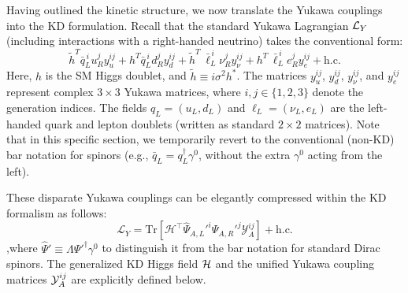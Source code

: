 Having outlined the kinetic structure, we now translate the Yukawa couplings into the KD formulation. 
Recall that the standard Yukawa Lagrangian ${\cal L}_{Y}$ (including interactions with a right-handed neutrino) takes the conventional form:
\begin{equation}\label{eq:Yukawa_standard}
     \tilde{h}^{T}\!\bar{q}_L^{\,i}u_R^j y_u^{ij} + 
     h^{T}\!\bar{q}_L^{\,i}d_R^j y_d^{ij} + \tilde{h}^{T\;\!}\!\bar{\ell}_L^{\,i}\nu_R^j y_\nu^{ij} + h^{T\;\!}\!\bar{\ell}_L^{\,i} e_R^j y_e^{ij} + \text{h.c.}
\end{equation}
Here, $h$ is the SM Higgs doublet, and $\tilde{h}\equiv i\sigma^{2}h^{\ast}$. The matrices $y_{u}^{ij}$, $y_{d}^{ij}$, $y_{\nu}^{ij}$, and $y_{e}^{ij}$ represent complex $3\times 3$ Yukawa matrices, where $i,j\in \{1,2,3\}$ denote the generation indices. The fields $q_{L}=(u_{L},d_{L})$ and $\ell_{L}=(\nu_{L},e_{L})$ are the left-handed quark and lepton doublets (written as standard $2\times2$ matrices). Note that in this specific section, we temporarily revert to the conventional (non-KD) bar notation for spinors (e.g., $\bar{q}_{L}=q_{L}^{\dagger}\gamma^{0}$, without the extra $\gamma^{0}$ acting from the left).

These disparate Yukawa couplings can be elegantly compressed within the KD formalism as follows:
\begin{equation}\label{eq:Yukawa_KD}
    \mathcal{L}_{Y}=
    \text{Tr}[\mathcal{H}^{\top}\widehat{\Psi}_{A,L}'^{i}\Psi_{A,R}'^j \mathcal{Y}_A^{ij}] + \text{h.c.}  
\end{equation}
,where $\widehat{\Psi}' \equiv \Lambda \Psi'^\dagger \gamma^0$ to distinguish it from the bar notation for standard Dirac spinors. The generalized KD Higgs field ${\cal H}$ and the unified Yukawa coupling matrices ${\cal Y}^{ij}_{A}$ are explicitly defined below.

